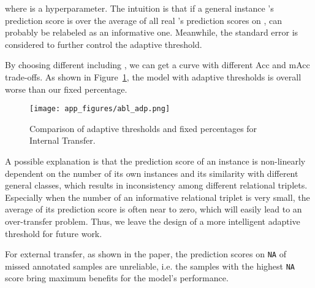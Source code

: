 \documentclass[runningheads]{llncs}
\begin{document}
where  is a hyperparameter.
The intuition is that if a general instance 's prediction score is over the average of all real 's prediction scores on ,   can probably be relabeled as an informative one.
Meanwhile, the standard error is considered to further control the adaptive threshold.

By choosing different  including , we can get a curve with different Acc and mAcc trade-offs.
As shown in Figure~\ref{fig:data_adp}, the model with adaptive thresholds is overall worse than our fixed percentage.

\begin{figure}[t]
    \centering
    \texttt{[image: app\_figures/abl\_adp.png]}
    \caption{Comparison of adaptive thresholds and fixed percentages for Internal Transfer.}
    \label{fig:data_adp}
\end{figure}

A possible explanation is that the prediction score of an instance is non-linearly dependent on the number of its own instances and its similarity with different general classes, which results in inconsistency among different relational triplets.
Especially when the number of an informative relational triplet is very small, the average of its prediction score is often near to zero, which will easily lead to an over-transfer problem.
Thus, we leave the design of a more intelligent adaptive threshold for future work.

For external transfer, as shown in the paper, the prediction scores on \texttt{NA} of missed annotated samples are unreliable, i.e. the samples with the highest \texttt{NA} score bring maximum benefits for the model's performance. 
\end{document}
